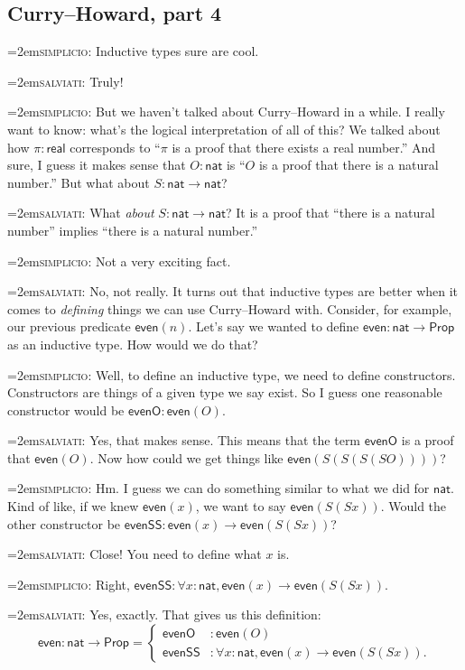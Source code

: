 \documentclass[11pt,paper=letter]{scrartcl}
\renewcommand{\sf}{\mathsf}
\newcommand{\simp}{\vspace{0.5em}\noindent\hangindent=2em\textsc{simplicio:} }
\newcommand{\salv}{\vspace{0.5em}\noindent\hangindent=2em\textsc{salviati:} }
\newcommand{\prop}{\mathsf{Prop}}
\begin{document}
\subsection{Curry--Howard, part 4}

\simp Inductive types sure are cool.

\salv Truly!

\simp But we haven't talked about Curry--Howard in a while. I really want to know: what's the logical interpretation of all of this? We talked about how $\pi : \sf{real}$ corresponds to ``$\pi$ is a proof that there exists a real number.'' And sure, I guess it makes sense that $O: \sf{nat}$ is ``$O$ is a proof that there is a natural number.'' But what about $S: \sf{nat} \to \sf{nat}$?

\salv What \emph{about} $S : \sf{nat} \to \sf{nat}$? It is a proof that ``there is a natural number'' implies ``there is a natural number.''

\simp Not a very exciting fact.

\salv No, not really. It turns out that inductive types are better when it comes to \emph{defining} things we can use Curry--Howard with. Consider, for example, our previous predicate $\sf{even}(n)$. Let's say we wanted to define $\sf{even} : \sf{nat} \to \prop$ as an inductive type. How would we do that?

\simp Well, to define an inductive type, we need to define constructors. Constructors are things of a given type we say exist. So I guess one reasonable constructor would be $\sf{evenO}: \sf{even}(O)$.

\salv Yes, that makes sense. This means that the term $\sf{evenO}$ is a proof that $\sf{even}(O)$. Now how could we get things like $\sf{even}(S(S(S(SO))))$?

\simp Hm. I guess we can do something similar to what we did for $\sf{nat}$. Kind of like, if we knew $\sf{even}(x)$, we want to say $\sf{even}(S(Sx))$. Would the other constructor be $\sf{evenSS}: \sf{even}(x) \to \sf{even}(S(Sx))$?

\salv Close! You need to define what $x$ is.

\simp Right, $\sf{evenSS}: \forall x: \sf{nat}, \sf{even}(x) \to \sf{even}(S(Sx))$.

\salv Yes, exactly. That gives us this definition:\[
  \sf{even} : \sf{nat} \to \prop = \begin{cases}
    \sf{evenO} &: \sf{even}(O) \\
    \sf{evenSS} &: \forall x: \sf{nat}, \sf{even}(x) \to \sf{even}(S(Sx)).
  \end{cases}
\]
\end{document}
